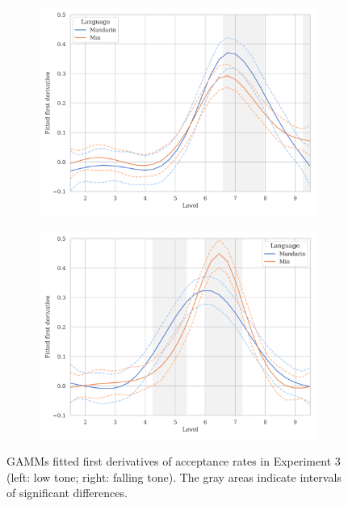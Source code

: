 \begin{figure}[hbt!]
\centering
\begin{subfigure}[b]{.45\textwidth}
\centering
\includegraphics[width=\textwidth]{figures/E3/Tone21_speed_GAMM.png}
\end{subfigure}
\hfill
\begin{subfigure}[b]{.45\textwidth}
\centering
\includegraphics[width=\textwidth]{figures/E3/Tone51_speed_GAMM.png}
\end{subfigure}
\caption{GAMMs fitted first derivatives of acceptance rates in Experiment 3 (left: low tone; right: falling tone). The gray areas indicate intervals of significant differences.}
\label{Figure:E3GAMM}
\end{figure}

